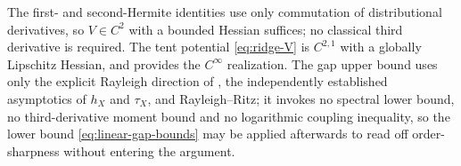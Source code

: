 \begin{remark}
\label{rem:ridge-regularity}
The first- and second-Hermite identities use only commutation of distributional derivatives, so
$V\in C^2$ with a bounded Hessian suffices; no classical third derivative is required. The tent
potential \eqref{eq:ridge-V} is $C^{2,1}$ with a globally Lipschitz Hessian, and
 provides the $C^\infty$ realization. The gap upper bound uses only the
explicit Rayleigh direction of , the independently established
asymptotics of $h_X$ and $\tau_X$, and Rayleigh--Ritz; it invokes no spectral lower bound, no
third-derivative moment bound and no logarithmic coupling inequality, so the lower bound
\eqref{eq:linear-gap-bounds} may be applied afterwards to read off order-sharpness without
entering the argument.
\end{remark}

